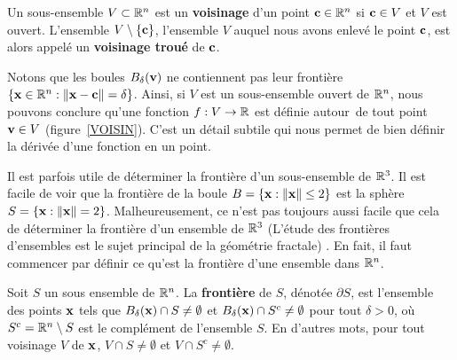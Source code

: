 {\begin{focus}{\dfn}
Un sous-ensemble $V \subset \mathbb{R}^n$ est un
{\bfseries voisinage} d'un
point $\mathbf{c} \in \mathbb{R}^n$ si $\mathbf{c} \in V$ et $V$ est ouvert.
L'ensemble $V\setminus \{\mathbf{c}\}$, l'ensemble $V$ auquel nous avons enlevé
le point $\mathbf{c}$, est alors appelé un
{\bfseries voisinage troué} de $\mathbf{c}$.
\end{focus}

Notons que les boules $B_\delta(\mathbf{v})$ ne contiennent pas leur
frontière $\{ \mathbf{x} \in \mathbb{R}^n : \|\mathbf{x}-\mathbf{c} \| = \delta \}$.
Ainsi, si $V$ est un sous-ensemble ouvert de $\mathbb{R}^n$, nous pouvons conclure
qu'une fonction $f:V\rightarrow \mathbb{R}$ est définie \flqq autour\frqq\ de
tout point $\mathbf{v} \in V$ (figure~\ref{VOISIN}).  C'est un
détail subtile qui nous permet de bien définir la dérivée
d'une fonction en un point.


Il est parfois utile de déterminer la frontière d'un sous-ensemble de
$\mathbb{R}^3$.  Il est facile de voir que la frontière de la boule
$B = \left\{ \mathbf{x} : \|\mathbf{x}\|\leq 2 \right\}$ est la sphère
$S = \left\{ \mathbf{x} : \|\mathbf{x}\|= 2 \right\}$.  Malheureusement, ce
n'est pas toujours aussi facile que cela de déterminer la frontière
d'un ensemble de $\mathbb{R}^3$ (L'étude des frontières d'ensembles est le
sujet principal de la géométrie fractale) .  En fait, il faut
commencer par définir ce qu'est la frontière d'une ensemble dans
$\mathbb{R}^n$.

\begin{focus}[\theory]{\dfn}
Soit $S$ un sous ensemble de $\mathbb{R}^n$.  La {\bfseries frontière}
 de $S$, dénotée $\partial S$, est
l'ensemble des points $\mathbf{x}$ tels que
$B_{\delta}(\mathbf{x}) \cap S \neq \emptyset$ et
$B_{\delta}(\mathbf{x}) \cap S^c \neq \emptyset$ pour tout $\delta >0$,
où $S^c = \mathbb{R}^n \setminus S$ est le complément de l'ensemble $S$.  En
d'autres mots, pour tout voisinage $V$ de $\mathbf{x}$,
$V \cap S \neq \emptyset$ et $V \cap S^c \neq \emptyset$.
\end{focus}

}
